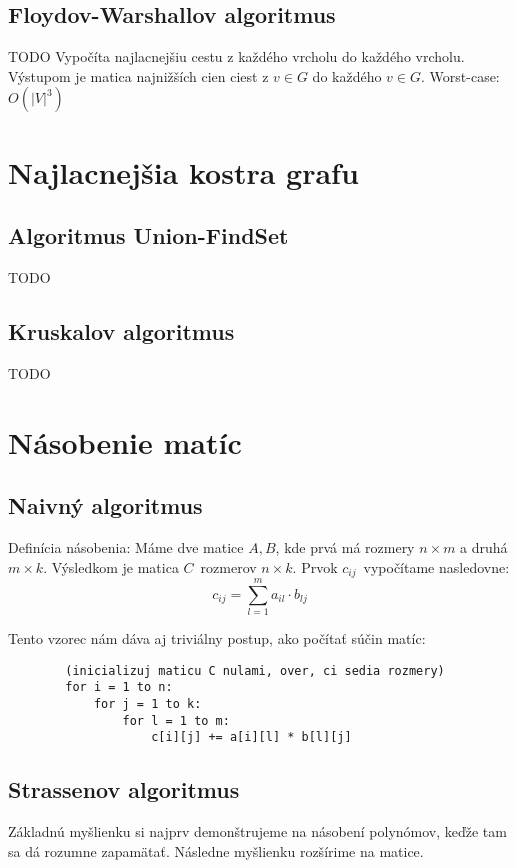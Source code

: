 	\subsection{Floydov-Warshallov algoritmus} TODO
		Vypočíta najlacnejšiu cestu z každého vrcholu do každého vrcholu. Výstupom je matica najnižších cien ciest z $v \in G$ do každého $v \in G$.
		Worst-case: $O(|V|^{3})$

\section{Najlacnejšia kostra grafu}

	\subsection{Algoritmus Union-FindSet} TODO

	\subsection{Kruskalov algoritmus} TODO

\section{Násobenie matíc}

	\subsection{Naivný algoritmus}
        Definícia násobenia: Máme dve matice $A, B$, kde prvá má rozmery $n \times m$ a druhá $m \times k$. Výsledkom
        je matica $C$ rozmerov $n \times k$. Prvok $c_{ij}$ vypočítame nasledovne:
        $$c_{ij} = \sum_{l=1}^{m} a_{il} \cdot b_{lj}$$

        Tento vzorec nám dáva aj triviálny postup, ako počítať súčin matíc:

        \begin{verbatim}
        (inicializuj maticu C nulami, over, ci sedia rozmery)
        for i = 1 to n:
            for j = 1 to k:
                for l = 1 to m:
                    c[i][j] += a[i][l] * b[l][j]
        \end{verbatim}

	\subsection{Strassenov algoritmus}
        Základnú myšlienku si najprv demonštrujeme na násobení polynómov, keďže tam sa dá rozumne zapamätať.
        Následne myšlienku rozšírime na matice.

